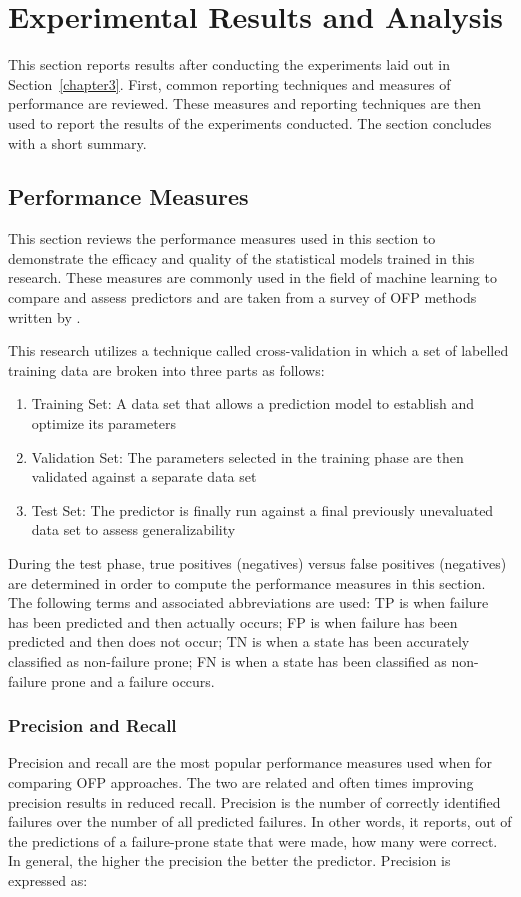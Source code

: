 \section{Experimental Results and Analysis} \label{chapter4}
This section reports results after conducting the experiments laid out in
Section~\ref{chapter3}.  First, common reporting techniques and measures of
performance are reviewed.  These measures and reporting techniques are then
used to report the results of the experiments conducted.  The section concludes
with a short summary.

\subsection{Performance Measures} \label{metrics}
This section reviews the performance measures used in this section to
demonstrate the efficacy and quality of the statistical models trained in this
research.  These measures are commonly used in the field of machine learning to
compare and assess predictors and are taken from a survey of \ac{OFP} methods
written by \citet{salfnerSurvey}.

This research utilizes a technique called cross-validation in which a set of
labelled training data are broken into three parts as follows:
\begin{enumerate}
\item{Training Set:  A data set that allows a prediction model to establish and
optimize its parameters}
\item{Validation Set:  The parameters selected in the training phase are then
validated against a separate data set}
\item{Test Set:  The predictor is finally run against a final previously
unevaluated data set to assess generalizability}
\end{enumerate}
During the test phase, true positives (negatives) versus false positives
(negatives) are determined in order to compute the performance measures in this
section.  The following terms and associated abbreviations are used: \ac{TP} is
when failure has been predicted and then actually occurs; \ac{FP} is when
failure has been predicted and then does not occur; \ac{TN} is when a state has
been accurately classified as non-failure prone; \ac{FN} is when a state has
been classified as non-failure prone and a failure occurs.

\subsubsection{Precision and Recall}
Precision and recall are the most popular performance measures used when
for comparing \ac{OFP} approaches.  The two are related and often times
improving precision results in reduced recall.  Precision is the number of
correctly identified failures over the number of all predicted failures.  In
other words, it reports, out of the predictions of a failure-prone state that
were made, how many were correct.  In general, the higher the precision the
better the predictor.  Precision is expressed as:

